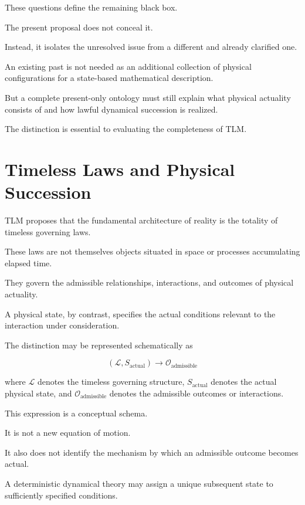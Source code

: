 \documentclass[12pt,onecolumn]{article}
\begin{document}
These questions define the remaining black box.

The present proposal does not conceal it.

Instead, it isolates the unresolved issue from a different and already clarified one.

An existing past is not needed as an additional collection of physical configurations for a state-based mathematical description.

But a complete present-only ontology must still explain what physical actuality consists of and how lawful dynamical succession is realized.

The distinction is essential to evaluating the completeness of TLM.


\section{Timeless Laws and Physical Succession}

TLM proposes that the fundamental architecture of reality is the totality of timeless governing laws.

These laws are not themselves objects situated in space or processes accumulating elapsed time.

They govern the admissible relationships, interactions, and outcomes of physical actuality.

A physical state, by contrast, specifies the actual conditions relevant to the interaction under consideration.

The distinction may be represented schematically as

\begin{equation}
\boxed{
\left(\mathcal{L},S_{\mathrm{actual}}\right)
\longrightarrow \mathcal{O}_{\mathrm{admissible}}
}
\end{equation}

where $\mathcal{L}$ denotes the timeless governing structure, $S_{\mathrm{actual}}$ denotes the actual physical state, and $\mathcal{O}_{\mathrm{admissible}}$ denotes the admissible outcomes or interactions.

This expression is a conceptual schema.

It is not a new equation of motion.

It also does not identify the mechanism by which an admissible outcome becomes actual.

A deterministic dynamical theory may assign a unique subsequent state to sufficiently specified conditions.
\end{document}

